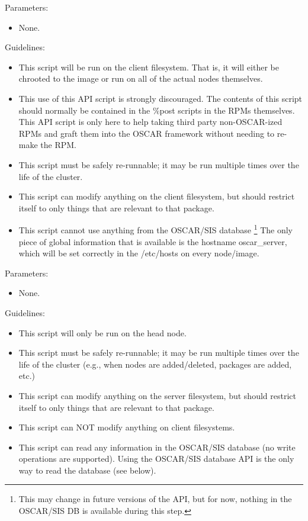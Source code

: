 Parameters:

\begin{itemize}
\item None.
\end{itemize}


Guidelines:

\begin{itemize}
\item This script will be run on the client filesystem.  That is, it will
  either be chrooted to the image or run on all of the actual nodes
  themselves.
\item This use of this API script is strongly discouraged.  The contents
  of this script should normally be contained in the \%post scripts in
  the RPMs themselves.  This API script is only here to help taking
  third party non-OSCAR-ized RPMs and graft them into the OSCAR
  framework without needing to re-make the RPM.
\item This script must be safely re-runnable; it may be run multiple times
  over the life of the cluster.
\item This script can modify anything on the client filesystem, but should
  restrict itself to only things that are relevant to that package.
\item This script cannot use anything from the OSCAR/SIS database
\footnote{This may change in future versions of the API, but for now,
nothing in the OSCAR/SIS DB is available during this step.}
  The only piece of global information that is available is the
  hostname oscar\_server, which will be set correctly in the /etc/hosts
  on every node/image.
\end{itemize}


Parameters:

\begin{itemize}
\item None.
\end{itemize}


Guidelines:

\begin{itemize}
\item This script will only be run on the head node.
\item This script must be safely re-runnable; it may be run multiple times
  over the life of the cluster (e.g., when nodes are added/deleted,
  packages are added, etc.)
\item This script can modify anything on the server filesystem, but should
  restrict itself to only things that are relevant to that package.
\item This script can NOT modify anything on client filesystems.
\item This script can read any information in the OSCAR/SIS database (no
  write operations are supported).  Using the OSCAR/SIS database API
  is the only way to read the database (see below).
\end{itemize}

